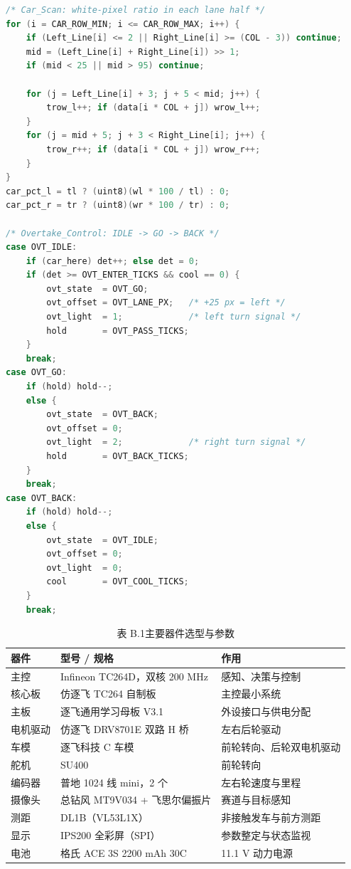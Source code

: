 \documentclass{MaiTechReport}
\begin{document}
\begin{lstlisting}[language=C]
/* Car_Scan: white-pixel ratio in each lane half */
for (i = CAR_ROW_MIN; i <= CAR_ROW_MAX; i++) {
    if (Left_Line[i] <= 2 || Right_Line[i] >= (COL - 3)) continue;
    mid = (Left_Line[i] + Right_Line[i]) >> 1;
    if (mid < 25 || mid > 95) continue;

    for (j = Left_Line[i] + 3; j + 5 < mid; j++) {
        trow_l++; if (data[i * COL + j]) wrow_l++;
    }
    for (j = mid + 5; j + 3 < Right_Line[i]; j++) {
        trow_r++; if (data[i * COL + j]) wrow_r++;
    }
}
car_pct_l = tl ? (uint8)(wl * 100 / tl) : 0;
car_pct_r = tr ? (uint8)(wr * 100 / tr) : 0;

/* Overtake_Control: IDLE -> GO -> BACK */
case OVT_IDLE:
    if (car_here) det++; else det = 0;
    if (det >= OVT_ENTER_TICKS && cool == 0) {
        ovt_state  = OVT_GO;
        ovt_offset = OVT_LANE_PX;   /* +25 px = left */
        ovt_light  = 1;             /* left turn signal */
        hold       = OVT_PASS_TICKS;
    }
    break;
case OVT_GO:
    if (hold) hold--;
    else {
        ovt_state  = OVT_BACK;
        ovt_offset = 0;
        ovt_light  = 2;             /* right turn signal */
        hold       = OVT_BACK_TICKS;
    }
    break;
case OVT_BACK:
    if (hold) hold--;
    else {
        ovt_state  = OVT_IDLE;
        ovt_offset = 0;
        ovt_light  = 0;
        cool       = OVT_COOL_TICKS;
    }
    break;
\end{lstlisting}


\begin{table}[htbp]
  \centering
  \caption*{表 B.1\quad 主要器件选型与参数}
  \label{tab:devices}
  \begin{tabular}{lll}
    \toprule
    器件 & 型号 / 规格 & 作用 \\
    \midrule
    主控 & Infineon TC264D，双核 200 MHz & 感知、决策与控制 \\
    核心板 & 仿逐飞 TC264 自制板 & 主控最小系统 \\
    主板 & 逐飞通用学习母板 V3.1 & 外设接口与供电分配 \\
    电机驱动 & 仿逐飞 DRV8701E 双路 H 桥 & 左右后轮驱动 \\
    车模 & 逐飞科技 C 车模 & 前轮转向、后轮双电机驱动 \\
    舵机 & SU400 & 前轮转向 \\
    编码器 & 普地 1024 线 mini，2 个 & 左右轮速度与里程 \\
    摄像头 & 总钻风 MT9V034 + 飞思尔偏振片 & 赛道与目标感知 \\
    测距 & DL1B（VL53L1X） & 非接触发车与前方测距 \\
    显示 & IPS200 全彩屏（SPI） & 参数整定与状态监视 \\
    电池 & 格氏 ACE 3S 2200 mAh 30C & 11.1 V 动力电源 \\
    \bottomrule
  \end{tabular}
\end{table}
\end{document}
